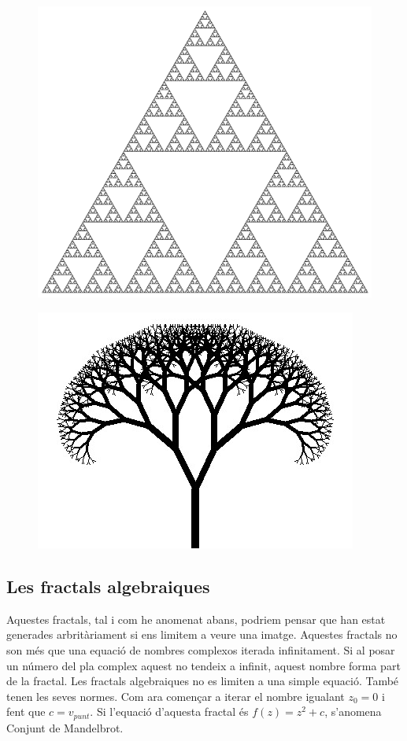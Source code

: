 \begin{figure}[h]
    \centering
    \begin{minipage}{.5\textwidth}
      \centering
      \includegraphics[width=.8\linewidth]{imatges/sierpinski.jpg}
      \label{fig:sierpinski}
    \end{minipage}%
    \begin{minipage}{.5\textwidth}
      \centering
      \includegraphics[width=.8\linewidth]{imatges/fractal-tree.jpg}
      \label{fig:arbre_fractal}
    \end{minipage}
\end{figure}
\noindent

\subsection{Les fractals algebraiques}
Aquestes fractals, tal i com he anomenat abans, podriem pensar que han estat generades arbritàriament si ens limitem a veure una imatge. Aquestes fractals no son més que una equació de nombres complexos iterada infinitament. Si al posar un número del pla complex aquest no tendeix a infinit, aquest nombre forma part de la fractal. \n
Les fractals algebraiques no es limiten a una simple equació. També tenen les seves normes. Com ara començar a iterar el nombre igualant $z_0 = 0$ i fent que $c = v_{punt}$. Si l'equació d'aquesta fractal és $f(z) = z^2 + c$, s'anomena Conjunt de Mandelbrot.

